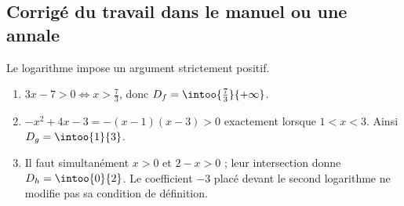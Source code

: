 \subsection{Corrigé du travail dans le manuel ou une annale}Le logarithme impose un argument strictement positif.
\begin{enumerate}
\item $3x-7>0\Longleftrightarrow x>\frac73$, donc $D_f=\intoo{\frac73}{+\infty}$.
\item $-x^2+4x-3=-(x-1)(x-3)>0$ exactement lorsque $1<x<3$. Ainsi $D_g=\intoo{1}{3}$.
\item Il faut simultanément $x>0$ et $2-x>0$ ; leur intersection donne $D_h=\intoo{0}{2}$. Le coefficient $-3$ placé devant le second logarithme ne modifie pas sa condition de définition.
\end{enumerate}

\fi

